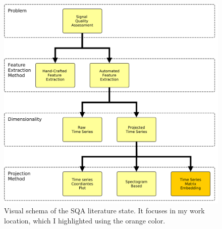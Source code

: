\begin{figure}[t]
	\centering
	\includegraphics[width=\SubjectTreeSize]{img/SubjectTree.png}
	\caption{Visual schema of the \acrlong{SQA} literature state. It focuses in my work location, which I highlighted using the orange color.}
	\label{fig:SubjectTree}
\end{figure}
